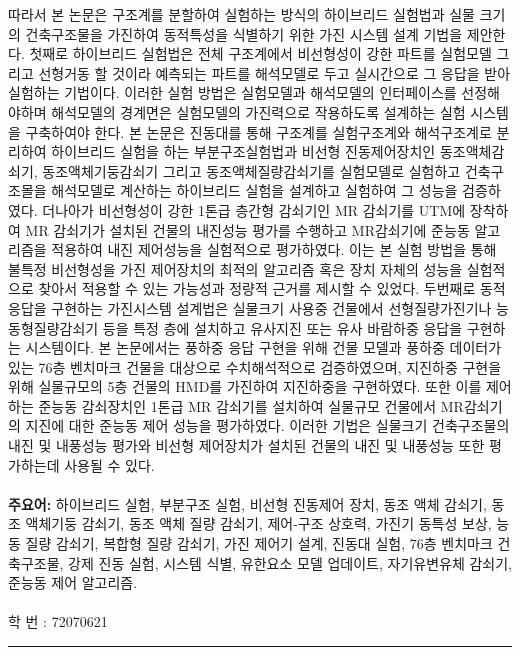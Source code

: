따라서 본 논문은 구조계를 분할하여 실험하는 방식의 하이브리드 실험법과 실물 크기의 건축구조물을 가진하여 동적특성을 식별하기 위한 가진 시스템 설계 기법을 제안한다. 첫째로 하이브리드 실험법은 전체 구조계에서 비선형성이 강한 파트를 실험모델 그리고 선형거동 할 것이라 예측되는 파트를 해석모델로 두고 실시간으로 그 응답을 받아 실험하는 기법이다. 이러한 실험 방법은 실험모델과 해석모델의 인터페이스를 선정해야하며 해석모델의 경계면은 실험모델의 가진력으로 작용하도록 설계하는 실험 시스템을 구축하여야 한다. 본 논문은 진동대를 통해 구조계를 실험구조계와 해석구조계로 분리하여 하이브리드 실험을 하는 부분구조실험법과 비선형 진동제어장치인 동조액체감쇠기, 동조액체기둥감쇠기 그리고 동조액체질량감쇠기를 실험모델로 실험하고 건축구조몰을 해석모델로 계산하는 하이브리드 실험을 설계하고 실험하여 그 성능을 검증하였다. 더나아가 비선형성이 강한 1톤급 층간형 감쇠기인 MR 감쇠기를 UTM에 장착하여 MR 감쇠기가 설치된 건물의 내진성능 평가를 수행하고 MR감쇠기에 준능동 알고리즘을 적용하여 내진 제어성능을 실험적으로 평가하였다. 이는 본 실험 방법을 통해 불특정 비선형성을 가진 제어장치의 최적의 알고리즘 혹은 장치 자체의 성능을 실험적으로 찾아서 적용할 수 있는 가능성과 정량적 근거를 제시할 수 있었다. 두번째로 동적 응답을 구현하는 가진시스템 설계법은 실물크기 사용중 건물에서 선형질량가진기나 능동형질량감쇠기 등을 특정 층에 설치하고 유사지진 또는 유사 바람하중 응답을 구현하는 시스템이다. 본 논문에서는 풍하중 응답 구현을 위해 건물 모델과 풍하중 데이터가 있는 76층 벤치마크 건물을 대상으로 수치해석적으로 검증하였으며, 지진하중 구현을 위해 실물규모의 5층 건물의 HMD를 가진하여 지진하중을 구현하였다. 또한 이를 제어하는 준능동 감쇠장치인 1톤급 MR 감쇠기를 설치하여 실물규모 건물에서 MR감쇠기의 지진에 대한 준능동 제어 성능을 평가하였다. 이러한 기법은 실물크기 건축구조물의 내진 및 내풍성능 평가와 비선형 제어장치가 설치된 건물의 내진 및 내풍성능 또한 평가하는데 사용될 수 있다.
\\
\\
{\large\textbf{주요어:}}
하이브리드 실험, 부분구조 실험, 비선형 진동제어 장치, 동조 액체 감쇠기, 동조 액체기둥 감쇠기, 동조 액체 질량 감쇠기, 제어-구조 상호력, 가진기 동특성 보상, 능동 질량 감쇠기, 복합형 질량 감쇠기, 가진 제어기 설계, 진동대 실험, 76층 벤치마크 건축구조물, 강제 진동 실험, 시스템 식별, 유한요소 모델 업데이트, 자기유변유체 감쇠기, 준능동 제어 알고리즘.
\\
\\
학 번 : 72070621\\
\noindent\rule[2pt]{\textwidth}{0.5pt}
